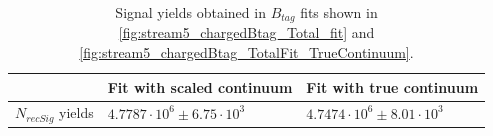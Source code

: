 \begin{table}[H]
    \begin{tabular}{ |p{2.5cm}||p{4.5cm}| p{4.5cm}| }
    \hline
        \    &  Fit with scaled continuum &  Fit with true continuum\\
     \hline
     $N_{recSig}$  yields     &  $4.7787  \cdot 10^6 \pm 6.75 \cdot 10^3 $   & $ 4.7474  \cdot 10^6 \pm 8.01 \cdot 10^3$\\
   
     \hline
    \end{tabular}
    \caption{Signal yields obtained in $B_{tag}$ fits shown in \cref{fig:stream5_chargedBtag_Total_fit} and \cref{fig:stream5_chargedBtag_TotalFit_TrueContinuum}.}
    \end{table}
    \vspace{0.2 cm}

